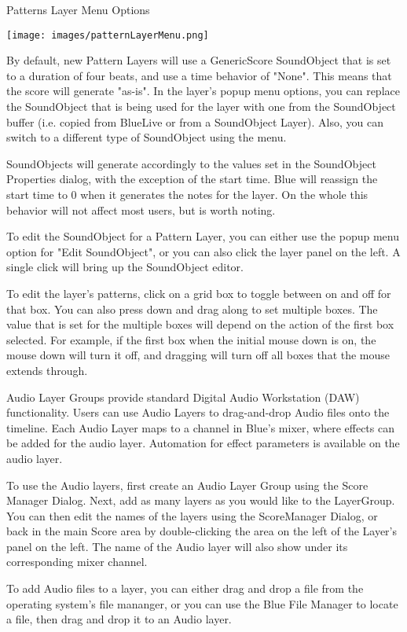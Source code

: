 Patterns Layer Menu Options

\texttt{[image: images/patternLayerMenu.png]}

By default, new Pattern Layers will use a GenericScore SoundObject that
is set to a duration of four beats, and use a time behavior of "None".
This means that the score will generate "as-is". In the layer's popup
menu options, you can replace the SoundObject that is being used for the
layer with one from the SoundObject buffer (i.e. copied from BlueLive or
from a SoundObject Layer). Also, you can switch to a different type of
SoundObject using the menu.

SoundObjects will generate accordingly to the values set in the
SoundObject Properties dialog, with the exception of the start time.
Blue will reassign the start time to 0 when it generates the notes for
the layer. On the whole this behavior will not affect most users, but is
worth noting.

To edit the SoundObject for a Pattern Layer, you can either use the
popup menu option for "Edit SoundObject", or you can also click the
layer panel on the left. A single click will bring up the SoundObject
editor.

To edit the layer's patterns, click on a grid box to toggle between on
and off for that box. You can also press down and drag along to set
multiple boxes. The value that is set for the multiple boxes will depend
on the action of the first box selected. For example, if the first box
when the initial mouse down is on, the mouse down will turn it off, and
dragging will turn off all boxes that the mouse extends through.

Audio Layer Groups provide standard Digital Audio Workstation (DAW)
functionality. Users can use Audio Layers to drag-and-drop Audio files
onto the timeline. Each Audio Layer maps to a channel in Blue's mixer,
where effects can be added for the audio layer. Automation for effect
parameters is available on the audio layer.

To use the Audio layers, first create an Audio Layer Group using the
Score Manager Dialog. Next, add as many layers as you would like to the
LayerGroup. You can then edit the names of the layers using the
ScoreManager Dialog, or back in the main Score area by double-clicking
the area on the left of the Layer's panel on the left. The name of the
Audio layer will also show under its corresponding mixer channel.

To add Audio files to a layer, you can either drag and drop a file from
the operating system's file mananger, or you can use the Blue File
Manager to locate a file, then drag and drop it to an Audio layer.

